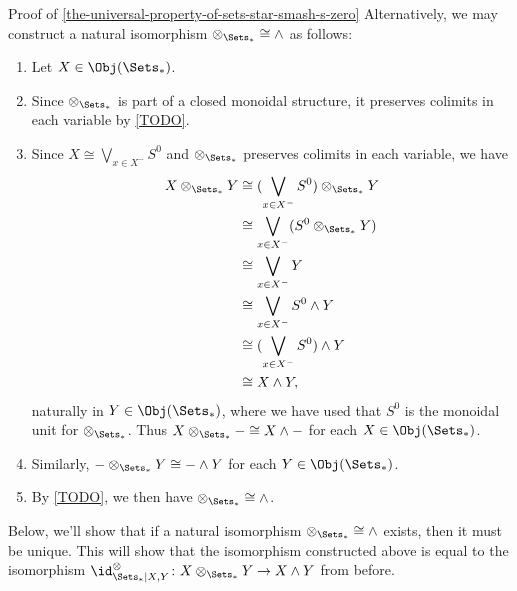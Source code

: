 \begin{Proof}{Proof of \cref{the-universal-property-of-sets-star-smash-s-zero}}
    Alternatively, we may construct a natural isomorphism $\mathord{\otimes_{\Sets_{*}}}\cong\mathord{\wedge}$ as follows:
    \begin{enumerate}
        \item\label{proof-of-the-universal-property-of-sets-times-pt-constructing-an-isomorphism-otimes-times-1}Let $X\in\Obj(\Sets_{*})$.
        \item\label{proof-of-the-universal-property-of-sets-times-pt-constructing-an-isomorphism-otimes-times-2}Since $\otimes_{\Sets_{*}}$ is part of a closed monoidal structure, it preserves colimits in each variable by \cref{TODO}.
        \item\label{proof-of-the-universal-property-of-sets-times-pt-constructing-an-isomorphism-otimes-times-3}Since $X\cong\bigvee_{x\in X^{-}}S^{0}$ and $\otimes_{\Sets_{*}}$ preserves colimits in each variable, we have
            \begin{align*}
                X\otimes_{\Sets_{*}}Y &\cong (\bigvee_{x\in X^{-}}S^{0})\otimes_{\Sets_{*}}Y\\
                                      &\cong \bigvee_{x\in X^{-}}(S^{0}\otimes_{\Sets_{*}}Y)\\
                                      &\cong \bigvee_{x\in X^{-}}Y\\
                                      &\cong \bigvee_{x\in X^{-}}S^{0}\wedge Y\\
                                      &\cong (\bigvee_{x\in X^{-}}S^{0})\wedge Y\\
                                      &\cong X\wedge Y,
            \end{align*}
            naturally in $Y\in\Obj(\Sets_{*})$, where we have used that $S^{0}$ is the monoidal unit for $\otimes_{\Sets_{*}}$. Thus $X\otimes_{\Sets_{*}}-\cong X\wedge-$ for each $X\in\Obj(\Sets_{*})$.
        \item\label{proof-of-the-universal-property-of-sets-times-pt-constructing-an-isomorphism-otimes-times-4}Similarly, $-\otimes_{\Sets_{*}}Y\cong-\wedge Y$ for each $Y\in\Obj(\Sets_{*})$.
        \item\label{proof-of-the-universal-property-of-sets-times-pt-constructing-an-isomorphism-otimes-times-5}By \cref{TODO}, we then have $\mathord{\otimes_{\Sets_{*}}}\cong\mathord{\wedge}$.
    \end{enumerate}
    Below, we'll show that if a natural isomorphism $\mathord{\otimes_{\Sets_{*}}}\cong\mathord{\wedge}$ exists, then it must be unique. This will show that the isomorphism constructed above is equal to the isomorphism $\id^{\otimes}_{\Sets_{*}|X,Y}\colon X\otimes_{\Sets_{*}}Y\to X\wedge Y$ from before.


\end{Proof}
